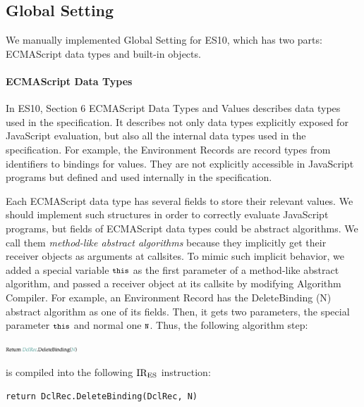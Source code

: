 \subsection{Global Setting}
We manually implemented \textsf{Global Setting} for ES10,
which has two parts: ECMAScript data types and built-in objects.

\vspace*{-.5em}
\paragraph{ECMAScript Data Types}
In ES10, Section 6 \textsf{ECMAScript Data Types and Values}
describes data types used in the specification.  It describes not only
data types explicitly exposed for JavaScript evaluation, but also all
the internal data types used in the specification.  For example, the
Environment Records are record types from identifiers to bindings for
values.  They are not explicitly accessible in JavaScript programs
but defined and used internally in the specification.

Each ECMAScript data type has several fields to store their relevant values.
We should implement such structures in order to correctly evaluate JavaScript
programs, but fields of ECMAScript data types could be abstract algorithms.
We call them \textit{method-like abstract algorithms} because they
implicitly get their receiver objects as arguments at callsites.
To mimic such implicit behavior, we added a special variable
\( \texttt{\footnotesize this} \) as the first parameter of a method-like abstract algorithm,
and passed a receiver object at its callsite by modifying
\textsf{Algorithm Compiler}.  For example, an Environment Record has
the \textsf{DeleteBinding (N)} abstract algorithm as one of its fields.
Then, it gets two parameters, the special parameter \( \texttt{\footnotesize this} \)
and normal one \( \texttt{\footnotesize N} \).  Thus, the following algorithm step:
\begin{center}
  \includegraphics[width=0.2\textwidth]{img/method-like-example.png}
\end{center}
is compiled into the following \( \text{IR}_\text{ES} \) instruction:
\begin{lstlisting}[style=ires]
return DclRec.DeleteBinding(DclRec, N)
\end{lstlisting}

\vspace*{-1em}
